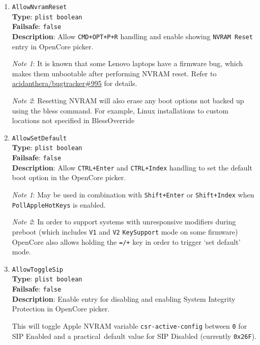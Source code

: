 \documentclass[]{article}
\begin{document}
\begin{enumerate}

\item
  \texttt{AllowNvramReset}\\
  \textbf{Type}: \texttt{plist\ boolean}\\
  \textbf{Failsafe}: \texttt{false}\\
  \textbf{Description}: Allow \texttt{CMD+OPT+P+R} handling and enable
  showing \texttt{NVRAM Reset} entry in OpenCore picker.

  \emph{Note 1}: It is known that some Lenovo laptops have a firmware
  bug, which makes them unbootable after performing NVRAM reset. Refer to
  \href{https://github.com/acidanthera/bugtracker/issues/995}{acidanthera/bugtracker\#995}
  for details.

  \emph{Note 2}: Resetting NVRAM will also erase any boot options not backed up using
  the bless command. For example, Linux installations to custom locations not specified
  in BlessOverride

\item
  \texttt{AllowSetDefault}\\
  \textbf{Type}: \texttt{plist\ boolean}\\
  \textbf{Failsafe}: \texttt{false}\\
  \textbf{Description}: Allow \texttt{CTRL+Enter} and \texttt{CTRL+Index} handling
  to set the default boot option in the OpenCore picker.

  \emph{Note 1}: May be used in combination
  with \texttt{Shift+Enter} or \texttt{Shift+Index} when \texttt{PollAppleHotKeys} is
  enabled.

  \emph{Note 2}: In order to support systems with unresponsive modifiers during preboot
  (which includes \texttt{V1} and \texttt{V2} \texttt{KeySupport} mode on some firmware)
  OpenCore also allows holding the \texttt{=/+} key in order to trigger `set default' mode.

\item
  \texttt{AllowToggleSip}\\
  \textbf{Type}: \texttt{plist\ boolean}\\
  \textbf{Failsafe}: \texttt{false}\\
  \textbf{Description}: Enable
  entry for disabling and enabling System Integrity Protection in OpenCore picker.

  This will toggle Apple NVRAM variable \texttt{csr-active-config} between \texttt{0} for
  SIP Enabled and a practical default value for SIP Disabled (currently \texttt{0x26F}).


\end{enumerate}
\end{document}
